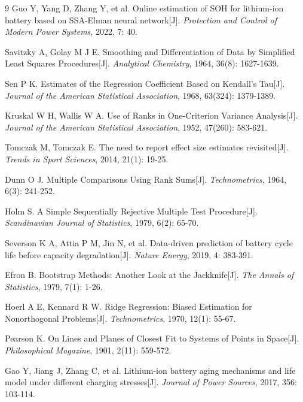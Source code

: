 \documentclass[12pt,a4paper]{article}
\newcommand{\bibfont}{\fontsize{10.6pt}{15pt}\selectfont}
\begin{document}
\renewcommand{\refname}{{\heiti 八、}参考文献}
\begingroup
\bibfont
\begin{thebibliography}{9}
    Guo Y, Yang D, Zhang Y, et al. Online estimation of SOH for lithium-ion battery based on SSA-Elman neural network[J]. \textit{Protection and Control of Modern Power Systems}, 2022, 7: 40.

    Savitzky A, Golay M J E. Smoothing and Differentiation of Data by Simplified Least Squares Procedures[J]. \textit{Analytical Chemistry}, 1964, 36(8): 1627-1639.

    Sen P K. Estimates of the Regression Coefficient Based on Kendall's Tau[J]. \textit{Journal of the American Statistical Association}, 1968, 63(324): 1379-1389.

    Kruskal W H, Wallis W A. Use of Ranks in One-Criterion Variance Analysis[J]. \textit{Journal of the American Statistical Association}, 1952, 47(260): 583-621.

    Tomczak M, Tomczak E. The need to report effect size estimates revisited[J]. \textit{Trends in Sport Sciences}, 2014, 21(1): 19-25.

    Dunn O J. Multiple Comparisons Using Rank Sums[J]. \textit{Technometrics}, 1964, 6(3): 241-252.

    Holm S. A Simple Sequentially Rejective Multiple Test Procedure[J]. \textit{Scandinavian Journal of Statistics}, 1979, 6(2): 65-70.

    Severson K A, Attia P M, Jin N, et al. Data-driven prediction of battery cycle life before capacity degradation[J]. \textit{Nature Energy}, 2019, 4: 383-391.

    Efron B. Bootstrap Methods: Another Look at the Jackknife[J]. \textit{The Annals of Statistics}, 1979, 7(1): 1-26.

    Hoerl A E, Kennard R W. Ridge Regression: Biased Estimation for Nonorthogonal Problems[J]. \textit{Technometrics}, 1970, 12(1): 55-67.

    Pearson K. On Lines and Planes of Closest Fit to Systems of Points in Space[J]. \textit{Philosophical Magazine}, 1901, 2(11): 559-572.

    Gao Y, Jiang J, Zhang C, et al. Lithium-ion battery aging mechanisms and life model under different charging stresses[J]. \textit{Journal of Power Sources}, 2017, 356: 103-114.


\end{thebibliography}
\end{document}
